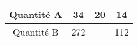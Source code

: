 \begin{tabular}{|c|c|c|c|}
\hline
Quantité A & 34 & 20 & 14 \\ \hline
Quantité B & 272 & \kern1cm & 112 \\ \hline
\end{tabular}

